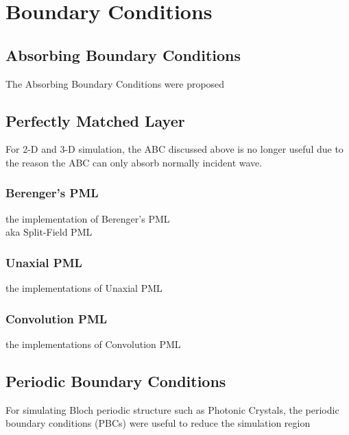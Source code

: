 \section{Boundary Conditions}

\subsection{Absorbing Boundary Conditions}

The Absorbing Boundary Conditions were proposed

\subsection{Perfectly Matched Layer}

For 2-D and 3-D simulation, the ABC discussed above is no longer useful due to the reason the ABC can only absorb
normally incident wave.

\subsubsection{Berenger's PML}
the implementation of Berenger's PML\\

aka Split-Field PML
\subsubsection{Unaxial PML}
the implementations of Unaxial PML
\subsubsection{Convolution PML}
the implementations of Convolution PML

\subsection{Periodic Boundary Conditions}

For simulating Bloch periodic structure such as Photonic Crystals, the periodic boundary conditions (PBCs) were useful
to reduce the simulation region

